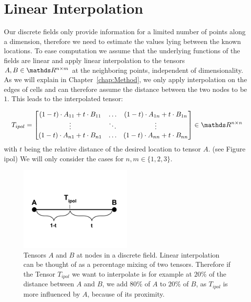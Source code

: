 \section{Linear Interpolation}

Our discrete fields only provide information for a limited number of
points along a dimension, therefore we need to estimate the values lying
between the known locations. To ease computation we assume that the
underlying functions of the fields are linear and apply linear
interpolation to the tensors $A, B \in \real^{n \times m}$ at the
neighboring points, independent of dimensionality. As we will explain in
Chapter~\ref{chap:Method}, we only apply interpolation on the edges of
cells and can therefore assume the distance between the two nodes to be
$1$. This leads to the interpolated tensor:

\begin{equation}
  T_{ipol} =
  \begin{bmatrix}
    (1-t) \cdot A_{11} + t \cdot B_{11} & \dots & (1-t) \cdot A_{1n} + t \cdot B_{1n} \\
    \vdots & \ddots & \vdots \\
    (1-t) \cdot A_{n1} + t \cdot B_{n1} & \dots & (1-t) \cdot A_{nn} + t \cdot B_{nn} \\
  \end{bmatrix}
  \in \real^{n \times n}
\end{equation}
with $t$ being the relative distance of the desired location to tensor
$A$. (see Figure ipol) We will only consider the cases for $n, m \in
\{1,2,3\}$.

\begin{figure}
  \centering
  \includegraphics[width=0.5\textwidth]{Images/linipol.pdf}
  \caption{Tensors $A$ and $B$ at nodes in a discrete field. Linear
  interpolation can be thought of as a percentage mixing of two tensors.
  Therefore if the Tensor $T_{ipol}$ we want to interpolate is for
  example at $20\%$ of the distance between $A$ and $B$, we add $80\%$
  of $A$ to $20\%$ of $B$, as $T_{ipol}$ is more influenced by $A$,
  because of its proximity.}

\end{figure}

